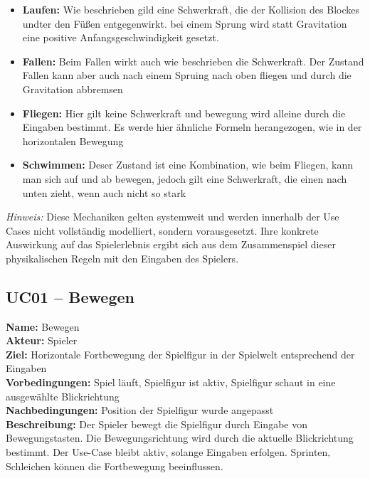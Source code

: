 \documentclass{article}
\begin{document}
\begin{itemize}
  \begin{itemize}
    \item \textbf{Laufen:} Wie beschrieben gild eine Schwerkraft, die der Kollision des Blockes undter den Füßen entgegenwirkt. bei einem Sprung wird statt Gravitation eine positive Anfangsgeschwindigkeit gesetzt.
    \item \textbf{Fallen:} Beim Fallen wirkt auch wie beschrieben die Schwerkraft. Der Zustand Fallen kann aber auch nach einem Spruing nach oben fliegen und durch die Gravitation abbremsen
    \item \textbf{Fliegen:} Hier gilt keine Schwerkraft und bewegung wird alleine durch die Eingaben bestimmt. Es werde hier ähnliche Formeln herangezogen, wie in der horizontalen Bewegung
    \item \textbf{Schwimmen:} Deser Zustand ist eine Kombination, wie beim Fliegen, kann man sich auf und ab bewegen, jedoch gilt eine Schwerkraft, die einen nach unten zieht, wenn auch nicht so stark
  \end{itemize}
\end{itemize}

\textit{Hinweis:} Diese Mechaniken gelten systemweit und werden innerhalb der Use Cases nicht vollständig modelliert, sondern vorausgesetzt. Ihre konkrete Auswirkung auf das Spielerlebnis ergibt sich aus dem Zusammenspiel dieser physikalischen Regeln mit den Eingaben des Spielers.

\newpage

\subsection*{UC01 – Bewegen}

\textbf{Name:} Bewegen \\
\textbf{Akteur:} Spieler \\
\textbf{Ziel:} Horizontale Fortbewegung der Spielfigur in der Spielwelt entsprechend der Eingaben \\
\textbf{Vorbedingungen:} Spiel läuft, Spielfigur ist aktiv, Spielfigur schaut in eine ausgewählte Blickrichtung \\
\textbf{Nachbedingungen:} Position der Spielfigur wurde angepasst \\
\textbf{Beschreibung:} Der Spieler bewegt die Spielfigur durch Eingabe von Bewegungstasten. Die Bewegungsrichtung wird durch die aktuelle Blickrichtung bestimmt. Der Use-Case bleibt aktiv, solange Eingaben erfolgen. Sprinten, Schleichen können die Fortbewegung beeinflussen.
\end{document}

